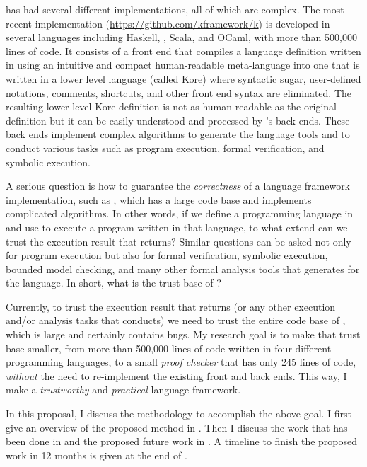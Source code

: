 \documentclass[11pt]{article}
\begin{document}
\K has had several different implementations, all of which are complex. 
The most recent \K implementation (\url{https://github.com/kframework/k})
is developed in several languages including
Haskell, \Cpp, Scala, and OCaml, with more than 500,000 lines of code.
It consists of a front end that compiles a language definition written in \K
using an intuitive and compact human-readable meta-language into 
one that is written in a lower level language (called Kore) where 
syntactic sugar, user-defined notations, comments, shortcuts, and other
front end syntax are eliminated.
The resulting lower-level Kore definition is not as human-readable as the original \K 
definition but it can be easily understood and processed by \K's back ends.
These back ends implement complex algorithms to generate the language tools
and to conduct various tasks such as program execution, formal verification, and 
symbolic execution. 

A serious question is how to guarantee the \emph{correctness}
of a language framework implementation, such as \K,  which has a large code 
base and implements complicated algorithms.
In other words, if we define a programming language in \K and
use \K to execute a program written in that language, 
to what extend can we trust the execution result that \K returns?
Similar questions can be asked not only for program execution but also for
formal verification, symbolic execution, bounded model checking, 
and many other formal analysis tools that \K generates for the language.
In short, what is the trust base of \K?

Currently, to trust the execution result that \K returns
(or any other execution and/or analysis tasks that \K conducts)
we need to trust the entire code base of \K, which is large and certainly contains bugs.
My research goal is to make that trust base smaller, from more than
500,000 lines of code written in four different programming languages,
to a small \emph{proof checker}
\cite{ml-checker}
that has only 245 lines of code, \emph{without} the need to re-implement the 
existing \K
front and back ends. 
This way, I make \K a \emph{trustworthy} and \emph{practical} language 
framework.

In this proposal, I discuss the methodology to accomplish the above goal. 
I first give an overview of the proposed method in .
Then I discuss the work that has been done in 
and the proposed future work in . 
A timeline to finish the proposed work in 12 months is given at the end of . 
\end{document}
